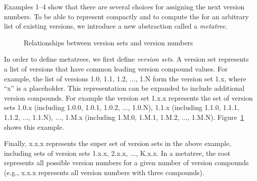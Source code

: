 \documentclass[conference]{IEEEtran}
\begin{document}



Examples 1--4 show that there are several choices for assigning the next version numbers. To be able to represent compactly and to compute the \numberchoices for an arbitrary list of existing versions, we introduce a new abstraction called a \emph{metatree}. 



\begin{figure}
\begin{center}

\end{center}
\caption{Relationships between version sets and version numbers}
\label{fig:diaVersionSet}
\end{figure}

In order to define metatrees, we first define \emph{version sets}.
A version set represents a list of versions that have common leading version compound values. For example, the list of versions 1.0, 1.1, 1.2, $\dots$, 1.N 
form the version set 1.x, where ``x'' is a placeholder.
This representation can be expanded to include additional version compounds. 
For example the version set 1.x.x represents the set of version sets 1.0.x (including 1.0.0, 1.0.1, 1.0.2, $\dots$, 1.0.N), 1.1.x (including 1.1.0, 1.1.1, 1.1.2, $\dots$, 1.1.N),  $\dots$, 1.M.x (including 1.M.0, 1.M.1, 1.M.2, $\dots$, 1.M.N). Figure~\ref{fig:diaVersionSet} shows this example.

Finally, x.x.x represents the super set of version sets in the above example, including sets of version sets 1.x.x, 2.x.x, $\dots$, K.x.x.
In a metatree, the root represents all possible version numbers 
for a given number of version compounds (e.g., x.x.x represents all version numbers with three compounds).

\end{document}
